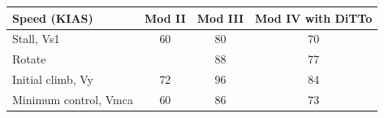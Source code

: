 \begin{tabularx}{\textwidth}{@{}>{\raggedright\arraybackslash}Xccc@{}}
\toprule
\textbf{Speed (KIAS)} & \textbf{Mod II} & \textbf{Mod III} & \textbf{Mod IV with DiTTo} \\
\midrule
Stall, Vs1 & 60 & 80 & 70 \\
Rotate &  & 88 & 77 \\
Initial climb, Vy & 72 & 96 & 84 \\
Minimum control, Vmca & 60 & 86 & 73 \\
\bottomrule
\end{tabularx}
